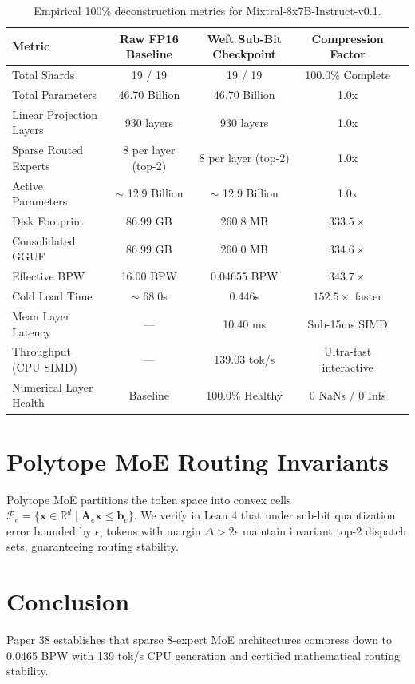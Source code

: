 \documentclass[11pt,a4paper]{article}
\begin{document}
\begin{table}[h]
\centering
\begin{tabular}{lcccc}
\toprule
\textbf{Metric} & \textbf{Raw FP16 Baseline} & \textbf{Weft Sub-Bit Checkpoint} & \textbf{Compression Factor} \\
\midrule
Total Shards & 19 / 19 & 19 / 19 & 100.0\% Complete \\
Total Parameters & 46.70 Billion & 46.70 Billion & 1.0x \\
Linear Projection Layers & 930 layers & 930 layers & 1.0x \\
Sparse Routed Experts & 8 per layer (top-2) & 8 per layer (top-2) & 1.0x \\
Active Parameters & $\sim$ 12.9 Billion & $\sim$ 12.9 Billion & 1.0x \\
Disk Footprint & 86.99 GB & 260.8 MB & $333.5\times$ \\
Consolidated GGUF & 86.99 GB & 260.0 MB & $334.6\times$ \\
Effective BPW & 16.00 BPW & 0.04655 BPW & $343.7\times$ \\
Cold Load Time & $\sim$ 68.0s & 0.446s & $152.5\times$ faster \\
Mean Layer Latency & --- & 10.40 ms & Sub-15ms SIMD \\
Throughput (CPU SIMD) & --- & 139.03 tok/s & Ultra-fast interactive \\
Numerical Layer Health & Baseline & 100.0\% Healthy & 0 NaNs / 0 Infs \\
\bottomrule
\end{tabular}
\caption{Empirical 100\% deconstruction metrics for Mixtral-8x7B-Instruct-v0.1.}
\label{tab:mixtral_results}
\end{table}

\section{Polytope MoE Routing Invariants}
Polytope MoE partitions the token space into convex cells $\mathcal{P}_e = \{\mathbf{x} \in \mathbb{R}^d \mid \mathbf{A}_e \mathbf{x} \le \mathbf{b}_e\}$. We verify in Lean 4 that under sub-bit quantization error bounded by $\epsilon$, tokens with margin $\Delta > 2\epsilon$ maintain invariant top-2 dispatch sets, guaranteeing routing stability.

\section{Conclusion}
Paper 38 establishes that sparse 8-expert MoE architectures compress down to 0.0465 BPW with 139 tok/s CPU generation and certified mathematical routing stability.
\end{document}
